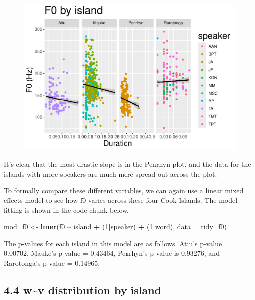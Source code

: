\documentclass[
  ,man,floatsintext]{apa6}
\newenvironment{Shaded}{\begin{snugshade}}{\end{snugshade}}
\newcommand{\AttributeTok}[1]{\textcolor[rgb]{0.13,0.29,0.53}{#1}}
\newcommand{\DecValTok}[1]{\textcolor[rgb]{0.00,0.00,0.81}{#1}}
\newcommand{\FunctionTok}[1]{\textcolor[rgb]{0.13,0.29,0.53}{\textbf{#1}}}
\newcommand{\NormalTok}[1]{#1}
\newcommand{\OtherTok}[1]{\textcolor[rgb]{0.56,0.35,0.01}{#1}}
\newcommand{\SpecialCharTok}[1]{\textcolor[rgb]{0.81,0.36,0.00}{\textbf{#1}}}
\begin{document}
\begin{figure}

{\centering \includegraphics[width=0.9\linewidth]{D2_CIM_files/figure-latex/print-f0-plot-1} 

}

\caption{ }\label{fig:print-f0-plot}
\end{figure}

It's clear that the most drastic slope is in the Penrhyn plot, and the data for the islands with more speakers are much more spread out across the plot.

To formally compare these different variables, we can again use a linear mixed effects model to see how f0 varies across these four Cook Islands. The model fitting is shown in the code chunk below.

\begin{Shaded}
\begin{Highlighting}[]
\NormalTok{mod\_f0 }\OtherTok{\textless{}{-}} \FunctionTok{lmer}\NormalTok{(f0 }\SpecialCharTok{\textasciitilde{}}\NormalTok{ island }\SpecialCharTok{+}\NormalTok{ (}\DecValTok{1}\SpecialCharTok{|}\NormalTok{speaker) }\SpecialCharTok{+}\NormalTok{ (}\DecValTok{1}\SpecialCharTok{|}\NormalTok{word), }\AttributeTok{data =}\NormalTok{ tidy\_f0)}
\end{Highlighting}
\end{Shaded}

The p-values for each island in this model are as follows. Atiu's p-value = 0.00702, Mauke's p-value = 0.43464, Penrhyn's p-value is 0.93276, and Rarotonga's p-value = 0.14965.

\subsection{4.4 w\textasciitilde v distribution by island}\label{wv-distribution-by-island}
\end{document}
